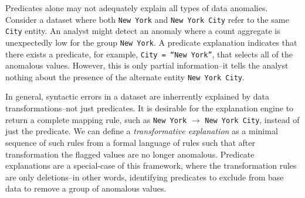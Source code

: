 Predicates alone may not adequately explain all types of data anomalies.
Consider a dataset where both \texttt{New York} and \texttt{New York City} refer to the same \texttt{City} entity.
An analyst might detect an anomaly where a count aggregate is unexpectedly low for the group \texttt{New York}. 
A predicate explanation indicates that there exists a predicate, for example, \texttt{City = ``New York''}, that selects all of the anomalous values. 
However, this is only partial information--it tells the analyst nothing about the presence of the alternate entity \texttt{New York City}. 

In general, syntactic errors in a dataset are inherrently explained by data transformations--not just predicates.
It is desirable for the explanation engine to return a complete mapping rule, such as  \texttt{New York} $\rightarrow$ \texttt{New York City}, instead of just the predicate.
We can define a \emph{transformative explanation} as a minimal sequence of such rules from a formal language of rules such that after transformation the flagged values are no longer anomalous. 
Predicate explanations are a special-case of this framework, where the transformation rules are only deletions--in other words, identifying predicates to exclude from base data to remove a group of anomalous values.

\fi

